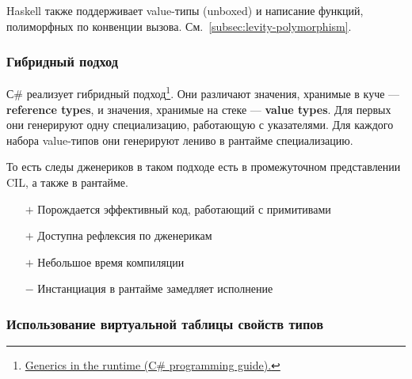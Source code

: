 \documentclass[12pt]{article}
\newcommand{\vocab}[1]{\textbf{#1}} %
\newcommand{\positive}{$+$} %
\newcommand{\negative}{{\color{red} $-$}} %
\begin{document}
    Haskell также поддерживает value-типы (unboxed) и написание функций, полиморфных по конвенции вызова.
    См.~\ref{subsec:levity-polymorphism}.


    \subsubsection{Гибридный подход}
    
    С\# реализует гибридный подход\footnote{\href{https://learn.microsoft.com/en-us/dotnet/csharp/programming-guide/generics/generics-in-the-run-time}{Generics in the runtime (C\# programming guide).}}.
    Они различают значения, хранимые в куче --- \vocab{reference types}, и значения, хранимые на стеке --- \vocab{value types}.
    Для первых они генерируют одну специализацию, работающую с указателями.
    Для каждого набора value-типов они генерируют лениво в рантайме специализацию.

    То есть следы дженериков в таком подходе есть в промежуточном представлении CIL, а также в рантайме.

    \begin{itemize}
        \item[\positive] Порождается эффективный код, работающий с примитивами
        \item[\positive] Доступна рефлексия по дженерикам
        \item[\positive] Небольшое время компиляции
        \item[\negative] Инстанциация в рантайме замедляет исполнение
    \end{itemize}

    \subsubsection{Использование виртуальной таблицы свойств типов}
\end{document}
